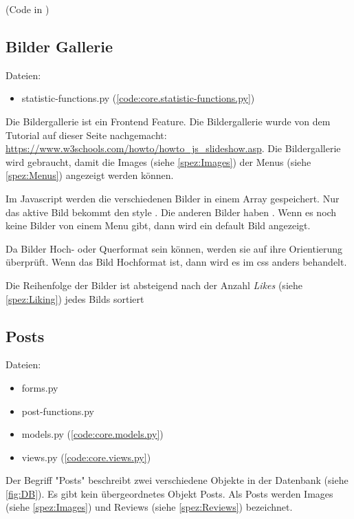 (Code in )

\subsection{Bilder Gallerie} \label{spez:Gallerie}

Dateien:
\begin{itemize}
    \item statistic-functions.py (\ref{code:core.statistic-functions.py})
\end{itemize}

Die Bildergallerie ist ein Frontend Feature. Die Bildergallerie wurde von dem
Tutorial auf dieser Seite nachgemacht:
\url{https://www.w3schools.com/howto/howto_js_slideshow.asp}. Die Bildergallerie
wird gebraucht, damit die Images (siehe \ref{spez:Images}) der Menus (siehe
\ref{spez:Menus}) angezeigt werden können.

Im Javascript werden die verschiedenen Bilder in einem Array gespeichert. Nur
das aktive Bild bekommt den style . Die anderen Bilder
haben . Wenn es noch keine Bilder von einem Menu gibt, dann
wird ein default Bild angezeigt.

Da Bilder Hoch- oder Querformat sein können, werden sie auf ihre Orientierung
überprüft. Wenn das Bild Hochformat ist, dann wird es im css anders
behandelt.

Die Reihenfolge der Bilder ist absteigend nach der Anzahl \emph{Likes} (siehe
\ref{spez:Liking}) jedes Bilds sortiert


\subsection{Posts} \label{spez:Posts}

Dateien:
\begin{itemize}
    \item forms.py 
    \item post-functions.py
    \item models.py (\ref{code:core.models.py})
    \item views.py (\ref{code:core.views.py})
\end{itemize}

Der Begriff "Posts" beschreibt zwei verschiedene Objekte in der Datenbank (siehe
\ref{fig:DB}). Es gibt kein übergeordnetes Objekt Posts. Als Posts werden Images
(siehe \ref{spez:Images}) und Reviews (siehe \ref{spez:Reviews}) bezeichnet.

